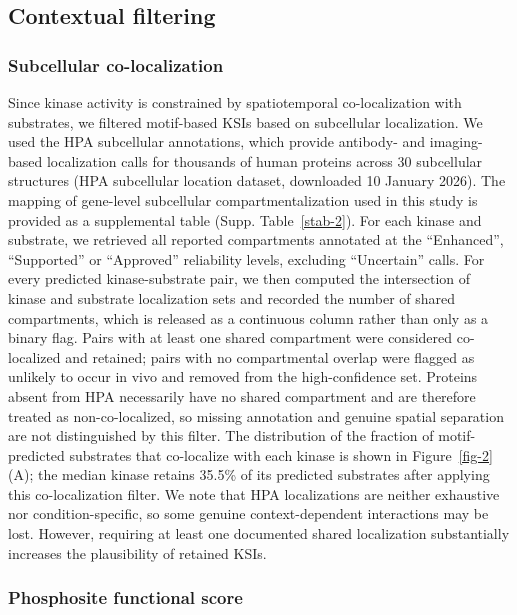 \documentclass[
  number,
  preprint,
  onecolumn]{elsarticle}
\begin{document}
\subsection{Contextual filtering}\label{contextual-filtering}

\subsubsection{Subcellular
co-localization}\label{subcellular-co-localization}

Since kinase activity is constrained by spatiotemporal co-localization
with substrates, we filtered motif-based KSIs based on subcellular
localization. We used the HPA subcellular annotations, which provide
antibody- and imaging-based localization calls for thousands of human
proteins across 30 subcellular structures \citep{Thul2017-cl} (HPA
subcellular location dataset, downloaded 10 January 2026). The mapping
of gene-level subcellular compartmentalization used in this study is
provided as a supplemental table (Supp. Table~\ref{stab-2}). For each
kinase and substrate, we retrieved all reported compartments annotated
at the ``Enhanced'', ``Supported'' or ``Approved'' reliability levels,
excluding ``Uncertain'' calls. For every predicted kinase-substrate
pair, we then computed the intersection of kinase and substrate
localization sets and recorded the number of shared compartments, which
is released as a continuous column rather than only as a binary flag.
Pairs with at least one shared compartment were considered co-localized
and retained; pairs with no compartmental overlap were flagged as
unlikely to occur in vivo and removed from the high-confidence set.
Proteins absent from HPA necessarily have no shared compartment and are
therefore treated as non-co-localized, so missing annotation and genuine
spatial separation are not distinguished by this filter. The
distribution of the fraction of motif-predicted substrates that
co-localize with each kinase is shown in Figure~\ref{fig-2}(A); the
median kinase retains 35.5\% of its predicted substrates after applying
this co-localization filter. We note that HPA localizations are neither
exhaustive nor condition-specific, so some genuine context-dependent
interactions may be lost. However, requiring at least one documented
shared localization substantially increases the plausibility of retained
KSIs.

\subsubsection{Phosphosite functional
score}\label{phosphosite-functional-score}
\end{document}
